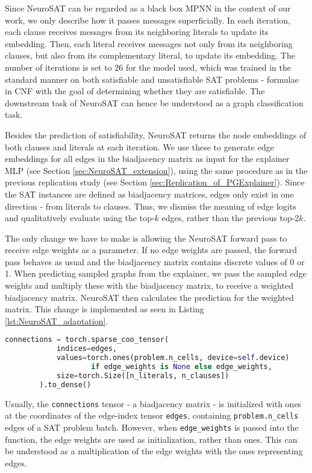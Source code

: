 Since NeuroSAT can be regarded as a black box MPNN in the context of our work, we only describe how it passes messages superficially. In each iteration, each clause receives messages from its neighboring literals to update its embedding. Then, each literal receives messages not only from its neighboring clauses, but also from its complementary literal, to update its embedding. The number of iterations is set to $26$ for the model used, which was trained in the standard manner on both satisfiable and unsatisfiable SAT problems - formulae in CNF with the goal of determining whether they are satisfiable. The downstream task of NeuroSAT can hence be understood as a graph classification task.

Besides the prediction of satisfiability, NeuroSAT returns the node embeddings of both clauses and literals at each iteration. We use these to generate edge embeddings for all edges in the biadjacency matrix as input for the explainer MLP (see Section \ref{sec:NeuroSAT_extension}), using the same procedure as in the previous replication study (see Section \ref{sec:Replication_of_PGExplainer}). Since the SAT instances are defined as biadjacency matrices, edges only exist in one direction - from literals to clauses. Thus, we dismiss the meaning of edge logits and qualitatively evaluate using the top-$k$ edges, rather than the previous top-$2k$. \bigskip

The only change we have to make is allowing the NeuroSAT forward pass to receive edge weights as a parameter. If no edge weights are passed, the forward pass behaves as usual and the biadjacency matrix contains discrete values of 0 or 1. When predicting sampled graphs from the explainer, we pass the sampled edge weights and multiply these with the biadjacency matrix, to receive a weighted biadjacency matrix. NeuroSAT then calculates the prediction for the weighted matrix. This change is implemented as seen in Listing \ref{lst:NeuroSAT_adaptation}.
\begin{lstlisting}[language=Python, caption=Adaptation of NeuroSAT., label=lst:NeuroSAT_adaptation]
    connections = torch.sparse_coo_tensor(
            indices=edges,
            values=torch.ones(problem.n_cells, device=self.device) 
                    if edge_weights is None else edge_weights,
            size=torch.Size([n_literals, n_clauses])
        ).to_dense()
\end{lstlisting}
Usually, the \lstinline|connections| tensor - a biadjacency matrix - is initialized with ones at the coordinates of the edge-index tensor \lstinline|edges|, containing \lstinline|problem.n_cells| edges of a SAT problem batch. However, when \lstinline|edge_weights| is passed into the function, the edge weights are used as initialization, rather than ones. This can be understood as a multiplication of the edge weights with the ones representing edges.

